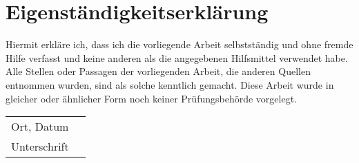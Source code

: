 \section*{Eigenständigkeitserklärung}

\vspace{1cm}

Hiermit erkläre ich, dass ich die vorliegende Arbeit selbstständig und ohne fremde Hilfe verfasst und keine anderen als die angegebenen Hilfsmittel verwendet habe. Alle Stellen oder Passagen der vorliegenden Arbeit, die anderen Quellen entnommen wurden, sind als solche kenntlich gemacht. Diese Arbeit wurde in gleicher oder ähnlicher Form noch keiner Prüfungsbehörde vorgelegt.

\vspace{2cm}

\noindent
\begin{tabular}{ll}
\cline{1-1}
Ort, Datum & \\[1cm]
\cline{1-1}
Unterschrift & \\
\end{tabular}